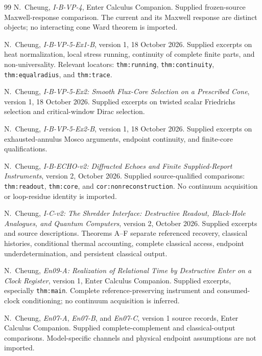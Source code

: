\documentclass[11pt,a4paper]{article}
\newcommand{\loc}[1]{\nolinkurl{#1}}
\theoremstyle{plain}
\theoremstyle{definition}
\theoremstyle{remark}
\numberwithin{equation}{section}
\begin{document}
\begin{thebibliography}{99}
\ddag N.~Cheung,
\emph{I-B-VP-4},
Enter Calculus Companion.
Supplied frozen-source Maxwell-response comparison.
The current and its Maxwell response are distinct objects;
no interacting cone Ward theorem is imported.

\ddag N.~Cheung,
\emph{I-B-VP-5-Ex1-B},
version 1, 18 October 2026.
Supplied excerpts on heat normalization, local stress running,
continuity of complete finite parts, and non-universality.
Relevant locators:
\loc{thm:running}, \loc{thm:continuity},
\loc{thm:equalradius}, and \loc{thm:trace}.

\ddag N.~Cheung,
\emph{I-B-VP-5-Ex2: Smooth Flux-Core Selection on a Prescribed Cone},
version 1, 18 October 2026.
Supplied excerpts on twisted scalar Friedrichs selection and
critical-window Dirac selection.

\ddag N.~Cheung,
\emph{I-B-VP-5-Ex2-B},
version 1, 18 October 2026.
Supplied excerpts on exhausted-annulus Mosco arguments,
endpoint continuity, and finite-core qualifications.

\ddag N.~Cheung,
\emph{I-B-ECHO-v2: Diffracted Echoes and Finite Supplied-Report
Instruments},
version 2, October 2026.
Supplied source-qualified comparisons:
\loc{thm:readout}, \loc{thm:core},
and \loc{cor:nonreconstruction}.
No continuum acquisition or loop-residue identity is imported.

\ddag N.~Cheung,
\emph{I-C-v2: The Shredder Interface:
Destructive Readout, Black-Hole Analogues, and Quantum Computers},
version 2, October 2026.
Supplied excerpts and source descriptions.
Theorems A--F separate referenced recovery, classical histories,
conditional thermal accounting, complete classical access,
endpoint underdetermination, and persistent classical output.

\ddag N.~Cheung,
\emph{En09-A: Realization of Relational Time by Destructive Enter
on a Clock Register},
version 1, Enter Calculus Companion.
Supplied excerpts, especially \loc{thm:main}.
Complete reference-preserving instrument and consumed-clock
conditioning; no continuum acquisition is inferred.

\ddag N.~Cheung,
\emph{En07-A}, \emph{En07-B}, and \emph{En07-C},
version 1 source records, Enter Calculus Companion.
Supplied complete-complement and classical-output comparisons.
Model-specific channels and physical endpoint assumptions are
not imported.


\end{thebibliography}
\end{document}

